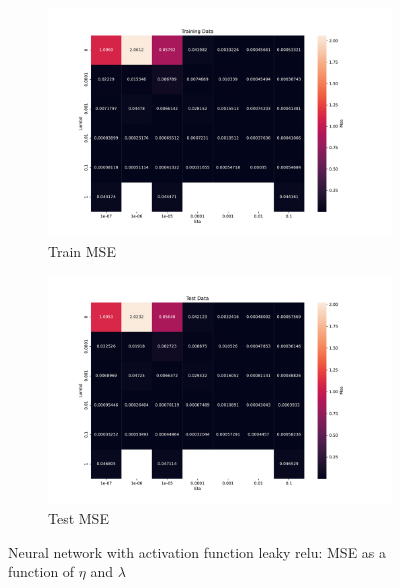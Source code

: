 \begin{figure}[htpb]
\begin{subfigure}{.5\textwidth}
  \centering
  \includegraphics[width=1.2\linewidth]{Figures/PartB/train_leaky_relu_MSE(eta,lmb)}
  \caption{Train MSE}
  \label{fig:train_leaky_relu_MSE-eta-lmb-}
\end{subfigure}%
\begin{subfigure}{.5\textwidth}
  \centering
  \includegraphics[width=1.2\linewidth]{Figures/PartB/test_leaky_relu_MSE(eta,lmb)}
  \caption{Test MSE}
  \label{fig:test_leaky_relu_MSE-eta-lmb-}
\end{subfigure}
\caption{Neural network with activation function leaky relu: MSE as a function of \(\eta \) and \(\lambda \) }
\label{fig:leaky_relu_MSE}
\end{figure}

